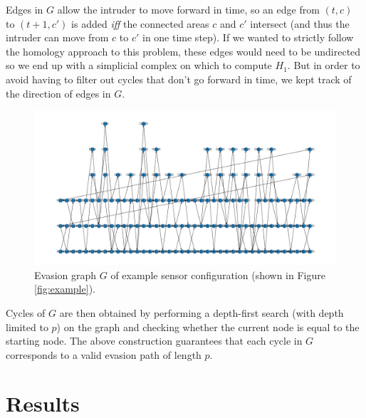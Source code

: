 \documentclass{article}
\begin{document}
Edges in $G$ allow the intruder to move forward in time, so an edge from $(t, c)$ to $(t + 1, c')$ is added {\it iff} the connected areas $c$ and $c'$ intersect (and thus the intruder can move from $c$ to $c'$ in one time step).
If we wanted to strictly follow the homology approach to this problem, these edges would need to be undirected so we end up with a simplicial complex on which to compute $H_1$.
But in order to avoid having to filter out cycles that don't go forward in time, we kept track of the direction of edges in $G$.

\begin{figure}[H]
  \centering
  \includegraphics[width=\linewidth]{example_graph.png}
  \caption{Evasion graph $G$ of example sensor configuration (shown in Figure \ref{fig:example}).}
  \label{fig:example_graph}
\end{figure}

Cycles of $G$ are then obtained by performing a depth-first search (with depth limited to $p$) on the graph and checking whether the current node is equal to the starting node.
The above construction guarantees that each cycle in $G$ corresponds to a valid evasion path of length $p$.


\section{Results}
\end{document}

